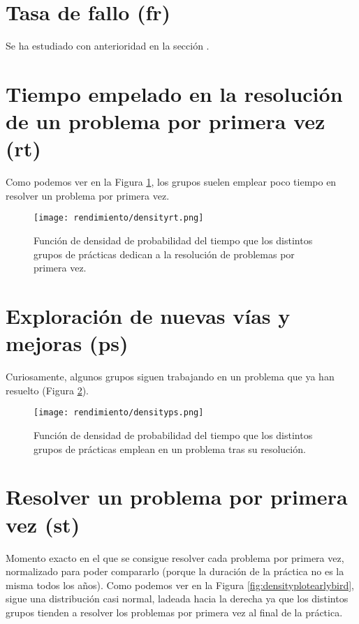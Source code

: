 \section{Tasa de fallo (fr)}

Se ha estudiado con anterioridad en la sección .

\section{Tiempo empelado en la resolución de un problema por primera vez (rt)}

Como podemos ver en la Figura \ref{fig:densityplotrt}, los grupos suelen emplear poco tiempo en resolver un problema por primera vez.

\begin{figure}[H]
    \centering
    \texttt{[image: rendimiento/densityrt.png]}
    \caption{Función de densidad de probabilidad del tiempo que los distintos grupos de prácticas dedican a la resolución de problemas por primera vez.}
    \label{fig:densityplotrt}
\end{figure}

\section{Exploración de nuevas vías y mejoras (ps)}

Curiosamente, algunos grupos siguen trabajando en un problema que ya han resuelto (Figura \ref{fig:densityplotps}).

\begin{figure}[H]
    \centering
    \texttt{[image: rendimiento/densityps.png]}
    \caption{Función de densidad de probabilidad del tiempo que los distintos grupos de prácticas emplean en un problema tras su resolución.}
    \label{fig:densityplotps}
\end{figure}

\section{Resolver un problema por primera vez (st)}

Momento exacto en el que se consigue resolver cada problema por primera vez, normalizado para poder compararlo (porque la duración de la práctica no es la misma todos los años). Como podemos ver en la Figura \ref{fig:densityplotearlybird}, sigue una distribución casi normal, ladeada hacia la derecha ya que los distintos grupos tienden a resolver los problemas por primera vez al final de la práctica.

